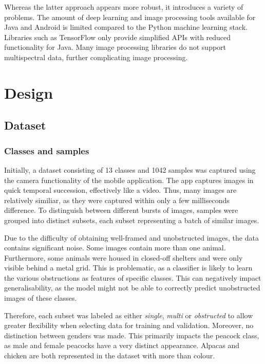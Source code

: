 \documentclass{l4proj}
\begin{document}
Whereas the latter approach appears more robust, it introduces a variety of problems. The amount of deep learning and image processing tools available for Java and Android is limited compared to the Python machine learning stack. Libraries such as TensorFlow only provide simplified APIs with reduced functionality for Java. Many image processing libraries do not support multispectral data, further complicating image processing.



\chapter{Design}
\label{design}

\section{Dataset}

\subsection{Classes and samples}
\label{classes_samples}

Initially, a dataset consisting of 13 classes and 1042 samples was captured using the camera functionality of the mobile application. The app captures images in quick temporal succession, effectively like a video. Thus, many images are relatively similiar, as they were captured within only a few milliseconds difference. To distinguish between different bursts of images, samples were grouped into distinct subsets, each subset representing a batch of similar images.

Due to the difficulty of obtaining well-framed and unobstructed images, the data contains significant noise. Some images contain more than one animal. Furthermore, some animals were housed in closed-off shelters and were only visible behind a metal grid. This is problematic, as a classifier is likely to learn the various obstructions as features of specific classes. This can negatively impact generalisability, as the model might not be able to correctly predict unobstructed images of these classes.

Therefore, each subset was labeled as either \textit{single}, \textit{multi} or \textit{obstructed} to allow greater flexibility when selecting data for training and validation. Moreover, no distinction between genders was made. This primarily impacts the peacock class, as male and female peacocks have a very distinct appearance. Alpacas and chicken are both represented in the dataset with more than colour.
\end{document}
